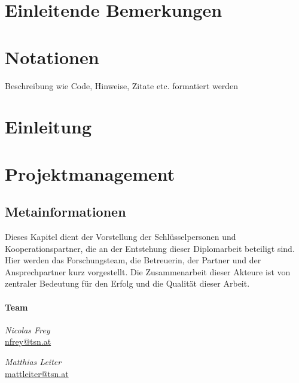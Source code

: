 \def \currentAuthor {Nicolas Frey} %

\chapter*{Einleitende Bemerkungen}



\chapter*{Notationen}
Beschreibung wie Code, Hinweise, Zitate etc. formatiert werden  



\chapter{Einleitung}



\chapter{Projektmanagement}



\section{Metainformationen}
Dieses Kapitel dient der Vorstellung der Schlüsselpersonen und Kooperationspartner, die an der Entstehung dieser Diplomarbeit beteiligt sind. Hier werden das Forschungsteam, die Betreuerin, der Partner und der Ansprechpartner kurz vorgestellt. Die Zusammenarbeit dieser Akteure ist von zentraler Bedeutung für den Erfolg und die Qualität dieser Arbeit.

\subsubsection*{Team}

\emph{Nicolas Frey} \\
\href{mailto:nfrey@tsn.at}{nfrey@tsn.at} 
\begin{figure}
\end{figure}

\emph{Matthias Leiter} \\
\href{mailto:mattleiter@tsn.at}{mattleiter@tsn.at} 
\begin{figure}
\end{figure}

